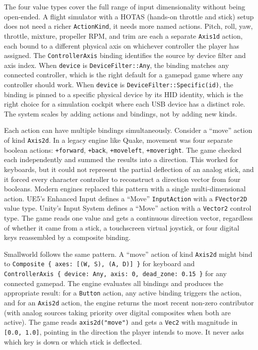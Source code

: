 \documentclass[
  11pt,
  letterpaper,
  DIV=11,
  numbers=noendperiod,
  twoside,
  open=right]{scrreprt}
\begin{document}
The four value types cover the full range of input dimensionality
without being open-ended. A flight simulator with a HOTAS (hands-on
throttle and stick) setup does not need a richer \texttt{ActionKind}, it
needs more named actions. Pitch, roll, yaw, throttle, mixture, propeller
RPM, and trim are each a separate \texttt{Axis1d} action, each bound to
a different physical axis on whichever controller the player has
assigned. The \texttt{ControllerAxis} binding identifies the source by
device filter and axis index. When \texttt{device} is
\texttt{DeviceFilter::Any}, the binding matches any connected
controller, which is the right default for a gamepad game where any
controller should work. When \texttt{device} is
\texttt{DeviceFilter::Specific(id)}, the binding is pinned to a specific
physical device by its HID identity, which is the right choice for a
simulation cockpit where each USB device has a distinct role. The system
scales by adding actions and bindings, not by adding new kinds.

Each action can have multiple bindings simultaneously. Consider a
``move'' action of kind \texttt{Axis2d}. In a legacy engine like Quake,
movement was four separate boolean actions: \texttt{+forward},
\texttt{+back}, \texttt{+moveleft}, \texttt{+moveright}. The game
checked each independently and summed the results into a direction. This
worked for keyboards, but it could not represent the partial deflection
of an analog stick, and it forced every character controller to
reconstruct a direction vector from four booleans. Modern engines
replaced this pattern with a single multi-dimensional action. UE5's
Enhanced Input defines a ``Move'' \texttt{InputAction} with a
\texttt{FVector2D} value type. Unity's Input System defines a ``Move''
action with a \texttt{Vector2} control type. The game reads one value
and gets a continuous direction vector, regardless of whether it came
from a stick, a touchscreen virtual joystick, or four digital keys
reassembled by a composite binding.

Smallworld follows the same pattern. A ``move'' action of kind
\texttt{Axis2d} might bind to
\texttt{Composite\ \{\ axes:\ {[}(W,\ S),\ (A,\ D){]}\ \}} for keyboard
and
\texttt{ControllerAxis\ \{\ device:\ Any,\ axis:\ 0,\ dead\_zone:\ 0.15\ \}}
for any connected gamepad. The engine evaluates all bindings and
produces the appropriate result: for a \texttt{Button} action, any
active binding triggers the action, and for an \texttt{Axis2d} action,
the engine returns the most recent non-zero contributor (with analog
sources taking priority over digital composites when both are active).
The game reads \texttt{axis2d("move")} and gets a \texttt{Vec2} with
magnitude in \texttt{{[}0.0,\ 1.0{]}}, pointing in the direction the
player intends to move. It never asks which key is down or which stick
is deflected.
\end{document}
